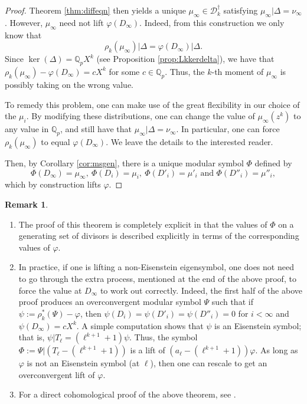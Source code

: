 \documentclass{amsart}
\theoremstyle{plain}
\theoremstyle{definition}
\newtheorem{remark}[thm]{Remark}
\newcommand{\D}{{\mathcal D}}
\newcommand{\Q}{{\mathbb Q}}
\newcommand{\Qp}{\Q_p}
\renewcommand{\sp}{{\rho^*_k}}
\newcommand{\spd}{{\rho_k}}
\newcommand{\Dkoc}{\D_k^\dag}
\begin{document}
\begin{proof}
Theorem \ref{thm:diffeqn} then yields a unique $\mu_\infty \in \Dkoc$ satisfying $\mu_\infty \big| \Delta = \nu_\infty$. However, $\mu_\infty$ need not lift $\varphi(D_\infty)$.  Indeed, from this construction we only know that
$$
\rho_k(\mu_\infty) \big| \Delta = \varphi(D_\infty) \big| \Delta.
$$
Since $\ker(\Delta) = \Qp X^k$ (see Proposition \ref{prop:Lkkerdelta}), we have that $\spd(\mu_\infty) - \varphi(D_\infty) = c X^k$ for some $c \in \Qp$.  Thus, the $k$-th moment of $\mu_\infty$ is possibly taking on the wrong value.

To remedy this problem, one can make use of the great flexibility in our choice of the $\mu_i$.  By modifying these distributions, one can change the value of $\mu_\infty(z^k)$ to any value in $\Qp$, and still have that $\mu_\infty \big| \Delta = \nu_\infty$. In particular, one can force $\spd(\mu_\infty)$ to equal $\varphi(D_\infty)$.  We leave the details to the interested reader.


Then, by Corollary \ref{cor:msgen}, there is a unique modular symbol
$\Phi$ defined by
$$
{\Phi}(D_\infty) = \mu_\infty,~ {\Phi}(D_i) = \mu_i,~
{\Phi}(D'_i) = \mu'_i \text{~and~} {\Phi}(D''_i) =
\mu''_i,
$$
which by construction lifts $\varphi$.
\end{proof}

\vspace{0.2cm}

\begin{remark}~
\begin{enumerate}
\item
The proof of this theorem is completely explicit in that the values of $\Phi$ on a generating set of divisors is described explicitly in terms of the corresponding values of $\varphi$.

\item
In practice, if one is lifting a non-Eisenstein eigensymbol, one does not need to go through the extra process, mentioned at the end of the above proof, to force the value at $D_\infty$ to work out correctly.  Indeed, the first half of the above proof produces an overconvergent modular symbol $\Psi$ such that if $\psi:=\sp(\Psi) - \varphi$, then
$\psi(D_i)=\psi(D'_i)=\psi(D''_i)=0$ for $i < \infty$ and $\psi(D_\infty) = c X^k$.  A simple computation shows that $\psi$ is an Eisenstein symbol; that is, $\psi \big| T_\ell = (\ell^{k+1} +1) \psi$.  Thus, the symbol $\Phi := \Psi \big| \left(T_\ell - (\ell^{k+1}+1)\right)$ is a lift of $(a_\ell - (\ell^{k+1} + 1)) \varphi$.  As long as $\varphi$ is not an Eisenstein symbol (at $\ell$), then one can rescale to get an overconvergent lift of $\varphi$.

\item
For a direct cohomological proof of the above theorem, see \cite{PS}.
\end{enumerate}
\end{remark}
\end{document}
